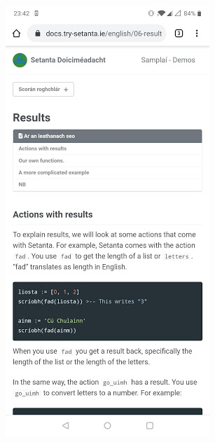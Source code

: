 \begin{center}
    \includegraphics[scale=0.5]{app4assets/docs-en-mobile}
    \label{screenshot:docs-en-mobile}
\end{center}

